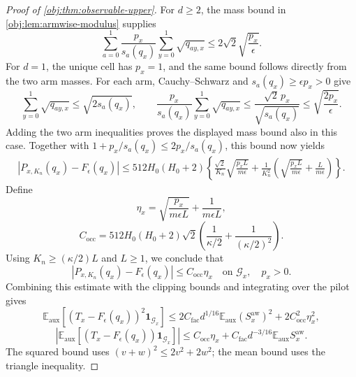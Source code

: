 \documentclass[11pt]{article}
\begin{document}
\begin{proof}[Proof of \cref{obj:thm:observable-upper}]
For \(d\ge2\), the mass bound in \cref{obj:lem:armwise-modulus} supplies
\[
\sum_{a=0}^1\frac{p_x}{s_a(q_x)}
\sum_{y=0}^1\sqrt{q_{ay,x}}
\le2\sqrt2\sqrt{\frac{p_x}{\epsilon}}.
\]
For \(d=1\), the unique cell has \(p_x=1\), and the same bound follows directly from the two arm masses. For each arm, Cauchy--Schwarz and \(s_a(q_x)\ge\epsilon p_x>0\) give
\[
\sum_{y=0}^1\sqrt{q_{ay,x}}\le\sqrt{2s_a(q_x)},
\qquad
\frac{p_x}{s_a(q_x)}\sum_{y=0}^1\sqrt{q_{ay,x}}
\le\frac{\sqrt2\,p_x}{\sqrt{s_a(q_x)}}
\le\sqrt{\frac{2p_x}{\epsilon}}.
\]
Adding the two arm inequalities proves the displayed mass bound also in this case.
Together with \(1+p_x/s_a(q_x)\le2p_x/s_a(q_x)\), this bound now yields
\[
\begin{aligned}
|P_{x,K_n}(q_x)-F_\epsilon(q_x)|
\le512H_0(H_0+2)
\left\{
\frac{\sqrt2}{K_n}\sqrt{\frac{p_xL}{m\epsilon}}
+
\frac1{K_n^2}
\left(\sqrt{\frac{p_xL}{m\epsilon}}+\frac L{m\epsilon}\right)
\right\}.
\end{aligned}
\]
Define
\[
\eta_x=
\sqrt{\frac{p_x}{m\epsilon L}}+\frac1{m\epsilon L},
\]
\[
C_{\mathrm{occ}}
=
512H_0(H_0+2)\sqrt2
\left(\frac1{\kappa/2}+\frac1{(\kappa/2)^2}\right).
\]
Using \(K_n\ge(\kappa/2)L\) and \(L\ge1\), we conclude that
\[
|P_{x,K_n}(q_x)-F_\epsilon(q_x)|
\le C_{\mathrm{occ}}\eta_x
\quad\text{on }\mathcal G_x,\quad p_x>0.
\]
Combining this estimate with the clipping bounds and integrating over the pilot gives
\[
\mathbb E_{\mathrm{aux}}
[(T_x-F_\epsilon(q_x))^2\mathbf1_{\mathcal G_x}]
\le
2C_{\mathrm{fac}}d^{1/16}
\mathbb E_{\mathrm{aux}}(S_x^{\mathrm{aw}})^2
+2C_{\mathrm{occ}}^2\eta_x^2,
\]
\[
\left|
\mathbb E_{\mathrm{aux}}
[(T_x-F_\epsilon(q_x))\mathbf1_{\mathcal G_x}]
\right|
\le
C_{\mathrm{occ}}\eta_x
+
C_{\mathrm{fac}}d^{-3/16}
\mathbb E_{\mathrm{aux}}S_x^{\mathrm{aw}}.
\]
The squared bound uses
\((v+w)^2\le2v^2+2w^2\); the mean bound uses the triangle inequality.


\end{proof}
\end{document}
